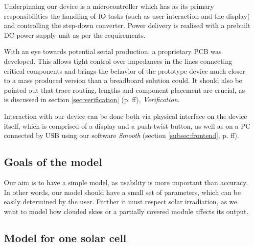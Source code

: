 
Underpinning  our  device  is  a  microcontroller which  has  as  its  primary
responsibilities the  handling of IO tasks  (such as user interaction  and the
display) and  controlling the step-down converter. Power  delivery is realised
with a prebuilt DC power supply unit as per the requirements.

With  an  eye towards  potential  serial  production,  a proprietary  PCB  was
developed.  This allows tight control  over impedances in the lines connecting
critical  components and  brings the  behavior  of the  prototype device  much
closer  to  a mass  produced  version  than  a breadboard  solution  could. It
should  also  be  pointed  out  that  trace  routing,  lengths  and  component
placement are crucial,  as is discussed in  section \ref{sec:verification} (p.
\pageref{sec:verification}ff), \emph{Verification}.

Interaction with  our device can  be done both  via physical interface  on the
device itself,  which is comprised  of a display  and a push-twist  button, as
well as  on a PC  connected by USB  using our software  \emph{Smooth} (section
\ref{subsec:frontend}, p. \pageref{subsec:frontend}ff).


\subsection{Goals of the model}

Our aim is to have a simple model, as usability is more important than accuracy.
In  other words, our model should have a small set of parameters, which  can  be
easily determined by the  user. Further it must respect solar irradiation, as we
want  to  model  how clouded skies or a partially  covered  module  affects  its
output.


\subsection{Model for one solar cell}

